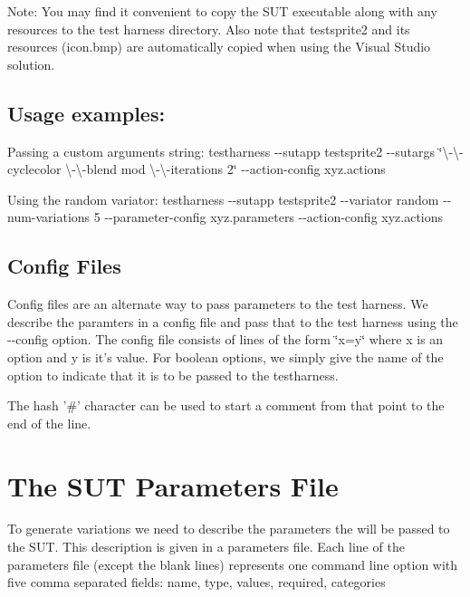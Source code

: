 Note\-: You may find it convenient to copy the S\-U\-T executable along with any resources to the test harness directory. Also note that testsprite2 and its resources (icon.\-bmp) are automatically copied when using the Visual Studio solution.\hypertarget{index_usageexamples_subsec}{}\subsection{Usage examples\-:}\label{index_usageexamples_subsec}
Passing a custom arguments string\-: {\ttfamily testharness -\/-\/sutapp testsprite2 -\/-\/sutargs \char`\"{}\textbackslash{}-\/\textbackslash{}-\/cyclecolor \textbackslash{}-\/\textbackslash{}-\/blend mod
\textbackslash{}-\/\textbackslash{}-\/iterations 2\char`\"{} -\/-\/action-\/config xyz.\-actions}

Using the random variator\-: {\ttfamily testharness -\/-\/sutapp testsprite2 -\/-\/variator random -\/-\/num-\/variations 5 -\/-\/parameter-\/config xyz.\-parameters -\/-\/action-\/config xyz.\-actions}\hypertarget{index_config_subsec}{}\subsection{Config Files}\label{index_config_subsec}
Config files are an alternate way to pass parameters to the test harness. We describe the paramters in a config file and pass that to the test harness using the -\/-\/config option. The config file consists of lines of the form \char`\"{}x=y\char`\"{} where x is an option and y is it's value. For boolean options, we simply give the name of the option to indicate that it is to be passed to the testharness.

The hash '\#' character can be used to start a comment from that point to the end of the line.\hypertarget{index_paramconfig_sec}{}\section{The S\-U\-T Parameters File}\label{index_paramconfig_sec}
To generate variations we need to describe the parameters the will be passed to the S\-U\-T. This description is given in a parameters file. Each line of the parameters file (except the blank lines) represents one command line option with five comma separated fields\-: {\ttfamily name, type, values, required, categories}

